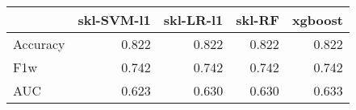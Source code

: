 \begin{tabular}{lrrrr}
\toprule
{} &  skl-SVM-l1 &  skl-LR-l1 &  skl-RF &  xgboost \\
\midrule
Accuracy &       0.822 &      0.822 &   0.822 &    0.822 \\
F1w      &       0.742 &      0.742 &   0.742 &    0.742 \\
AUC      &       0.623 &      0.630 &   0.630 &    0.633 \\
\bottomrule
\end{tabular}
